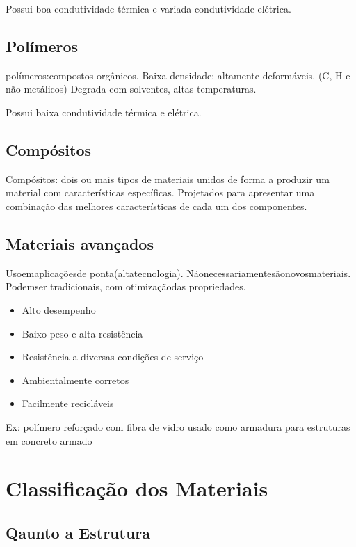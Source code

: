 Possui boa condutividade térmica e variada condutividade elétrica.
\subsection*{Polímeros}
polímeros:compostos orgânicos. Baixa densidade; altamente deformáveis. (C, H e não-metálicos)
Degrada com solventes, altas temperaturas.

Possui baixa condutividade térmica e elétrica.
\subsection*{Compósitos}
Compósitos: dois ou mais tipos de materiais unidos de forma a produzir um material com características específicas. Projetados para apresentar uma combinação das melhores características de cada um dos componentes.

\subsection*{Materiais avançados}
Usoemaplicaçõesde ponta(altatecnologia). Nãonecessariamentesãonovosmateriais. Podemser tradicionais, com otimizaçãodas propriedades.

\begin{itemize}
		
	\setlength{\parskip}{0pt}
	\setlength{\itemsep}{0pt plus 1pt}
	
\item Alto desempenho
\item Baixo peso e alta resistência
\item Resistência a diversas condições de serviço
\item Ambientalmente corretos
\item Facilmente recicláveis
\end{itemize}
Ex: polímero reforçado com fibra de vidro usado como armadura para estruturas em concreto armado


\section{Classificação dos Materiais}

\subsection*{Qaunto a Estrutura}

